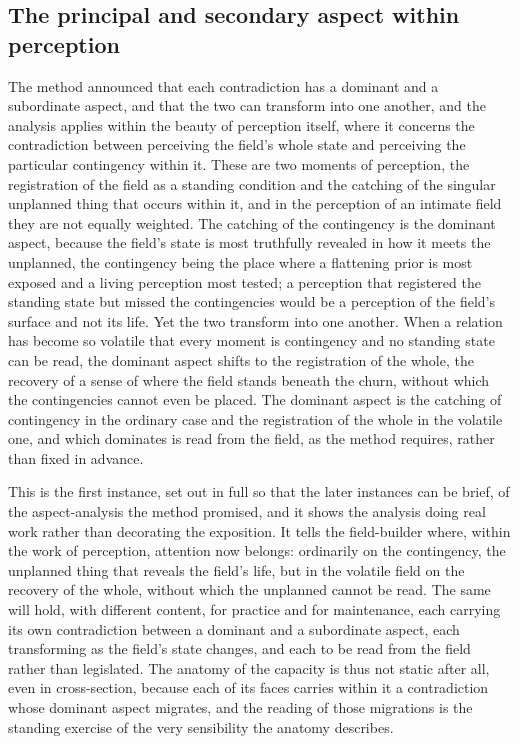 \subsection{The principal and secondary aspect within perception}
\label{p22:sub:perception-aspect}

The method announced that each contradiction has a dominant and a subordinate aspect, and that the two can transform into one another, and the analysis applies within the beauty of perception itself, where it concerns the contradiction between perceiving the field's whole state and perceiving the particular contingency within it. These are two moments of perception, the registration of the field as a standing condition and the catching of the singular unplanned thing that occurs within it, and in the perception of an intimate field they are not equally weighted. The catching of the contingency is the dominant aspect, because the field's state is most truthfully revealed in how it meets the unplanned, the contingency being the place where a flattening prior is most exposed and a living perception most tested; a perception that registered the standing state but missed the contingencies would be a perception of the field's surface and not its life. Yet the two transform into one another. When a relation has become so volatile that every moment is contingency and no standing state can be read, the dominant aspect shifts to the registration of the whole, the recovery of a sense of where the field stands beneath the churn, without which the contingencies cannot even be placed. The dominant aspect is the catching of contingency in the ordinary case and the registration of the whole in the volatile one, and which dominates is read from the field, as the method requires, rather than fixed in advance.

This is the first instance, set out in full so that the later instances can be brief, of the aspect-analysis the method promised, and it shows the analysis doing real work rather than decorating the exposition. It tells the field-builder where, within the work of perception, attention now belongs: ordinarily on the contingency, the unplanned thing that reveals the field's life, but in the volatile field on the recovery of the whole, without which the unplanned cannot be read. The same will hold, with different content, for practice and for maintenance, each carrying its own contradiction between a dominant and a subordinate aspect, each transforming as the field's state changes, and each to be read from the field rather than legislated. The anatomy of the capacity is thus not static after all, even in cross-section, because each of its faces carries within it a contradiction whose dominant aspect migrates, and the reading of those migrations is the standing exercise of the very sensibility the anatomy describes.
